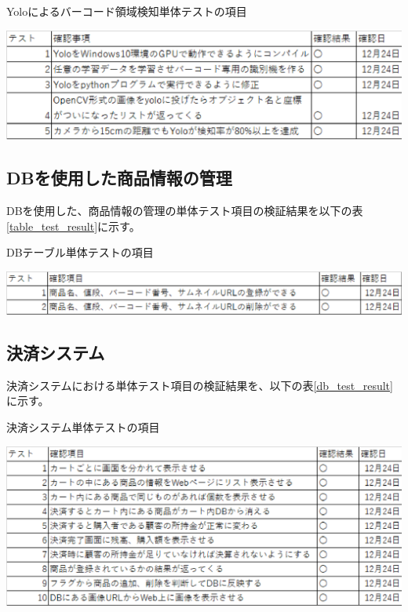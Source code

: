 \begin{table}[htbp]
\centering
\caption{Yoloによるバーコード領域検知単体テストの項目}
\includegraphics[width=14cm]{./pic/result/yolo_test_result.eps}
\label{yolo_test_result}
\end{table}

\newpage

\subsection*{DBを使用した商品情報の管理}
DBを使用した、商品情報の管理の単体テスト項目の検証結果を以下の表\ref{table_test_result}に示す。

\begin{table}[htbp]
\centering
\caption{DBテーブル単体テストの項目}
\includegraphics[width=15cm]{./pic/result/table_test_result.eps}
\label{table_test_result}
\end{table}

\subsection*{決済システム}
決済システムにおける単体テスト項目の検証結果を、以下の表\ref{db_test_result}に示す。

\begin{table}[htbp]
\centering
\caption{決済システム単体テストの項目}
\includegraphics[width=15cm]{./pic/result/db_test_result.eps}
\label{db_test_result}
\end{table}

